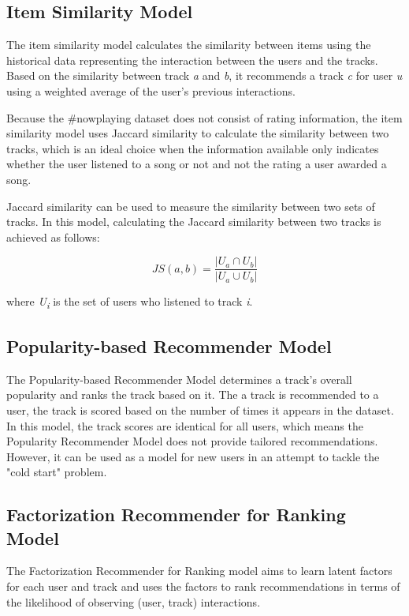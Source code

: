\documentclass{article} %
\begin{document}
\subsection{Item Similarity Model}

The item similarity model calculates the similarity between items using the historical data representing the interaction between the users and the tracks. Based on the similarity between track \textit{a} and \textit{b}, it recommends a track \textit{c} for user \textit{u} using a weighted average of the user's previous interactions.

Because the \#nowplaying dataset does not consist of rating information, the item similarity model uses Jaccard similarity to calculate the similarity between two tracks, which is an ideal choice when the information available only indicates whether the user listened to a song or not and not the rating a user awarded a song.

Jaccard similarity can be used to measure the similarity between two sets of tracks. In this model, calculating the Jaccard similarity between two tracks is achieved as follows:

\begin{equation}
    JS(a,b) = \frac{|U_a \cap U_b|}{|U_a \cup U_b|}
\end{equation}

where \textit{U\textsubscript{i}} is the set of users who listened to track \textit{i}.

\subsection{Popularity-based Recommender Model}

The Popularity-based Recommender Model determines a track's overall popularity and ranks the track based on it. The a track is recommended to a user, the track is scored based on the number of times it appears in the dataset. In this model, the track scores are identical for all users, which means the Popularity Recommender Model does not provide tailored recommendations. However, it can be used as a model for new users in an attempt to tackle the "cold start" problem.

\subsection{Factorization Recommender for Ranking Model}

The Factorization Recommender for Ranking model aims to learn latent factors for each user and track and uses the factors to rank recommendations in terms of the likelihood of observing (user, track) interactions.
\end{document}

